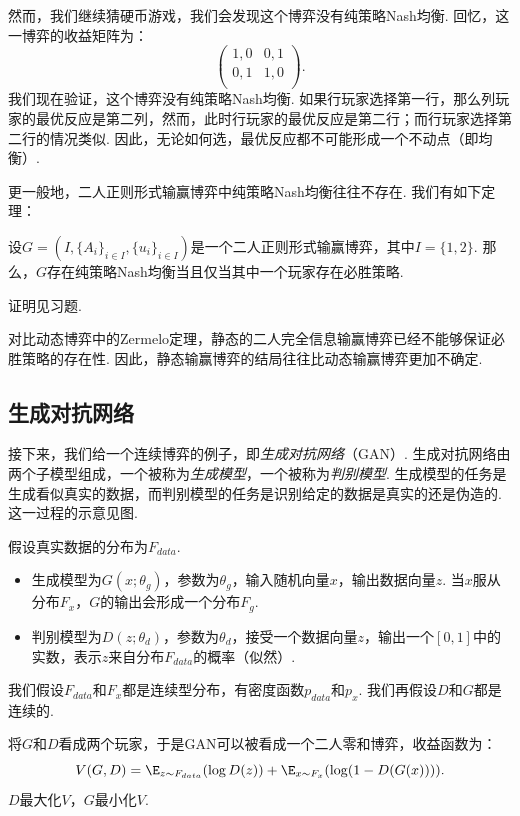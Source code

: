 然而，我们继续猜硬币游戏，我们会发现这个博弈没有纯策略Nash均衡. 回忆，这一博弈的收益矩阵为：
    \[
    \begin{pmatrix}
    1,0&0,1\\
    0,1&1,0\\
    \end{pmatrix}.
    \]
我们现在验证，这个博弈没有纯策略Nash均衡. 如果行玩家选择第一行，那么列玩家的最优反应是第二列，然而，此时行玩家的最优反应是第二行；而行玩家选择第二行的情况类似. 因此，无论如何选，最优反应都不可能形成一个不动点（即均衡）.

更一般地，二人正则形式输赢博弈中纯策略Nash均衡往往不存在. 我们有如下定理：
\begin{theorem}
设$G=(I,\{A_i\}_{i\in I}, \{u_i\}_{i\in I})$是一个二人正则形式输赢博弈，其中$I=\{1,2\}$. 那么，$G$存在纯策略Nash均衡当且仅当其中一个玩家存在必胜策略. %
\end{theorem}
证明见习题.

对比动态博弈中的Zermelo定理，静态的二人完全信息输赢博弈已经不能够保证必胜策略的存在性. 因此，静态输赢博弈的结局往往比动态输赢博弈更加不确定.


\subsection{生成对抗网络}

接下来，我们给一个连续博弈的例子，即\emph{生成对抗网络}（GAN）. 生成对抗网络由两个子模型组成，一个被称为\emph{生成模型}，一个被称为\emph{判别模型}. 生成模型的任务是生成看似真实的数据，而判别模型的任务是识别给定的数据是真实的还是伪造的. 这一过程的示意见图.

假设真实数据的分布为$F_{data}$. 
\begin{itemize}
    \item 生成模型为$G(x;\theta_g)$，参数为$\theta_g$，输入随机向量$x$，输出数据向量$z$. 当$x$服从分布$F_x$，$G$的输出会形成一个分布$F_g$. 
    \item 判别模型为$D(z;\theta_d)$，参数为$\theta_d$，接受一个数据向量$z$，输出一个$[0,1]$中的实数，表示$z$来自分布$F_{data}$的概率（似然）.
\end{itemize}
我们假设$F_{data}$和$F_x$都是连续型分布，有密度函数$p_{data}$和$p_x$. 我们再假设$D$和$G$都是连续的.

将$G$和$D$看成两个玩家，于是GAN可以被看成一个二人零和博弈，收益函数为：
    \[
        V(G,D)=\E_{z\sim F_{data}}(\log D(z))+\E_{x\sim F_x}(\log(1-D(G(x)))).
    \]
$D$最大化$V$，$G$最小化$V$.

